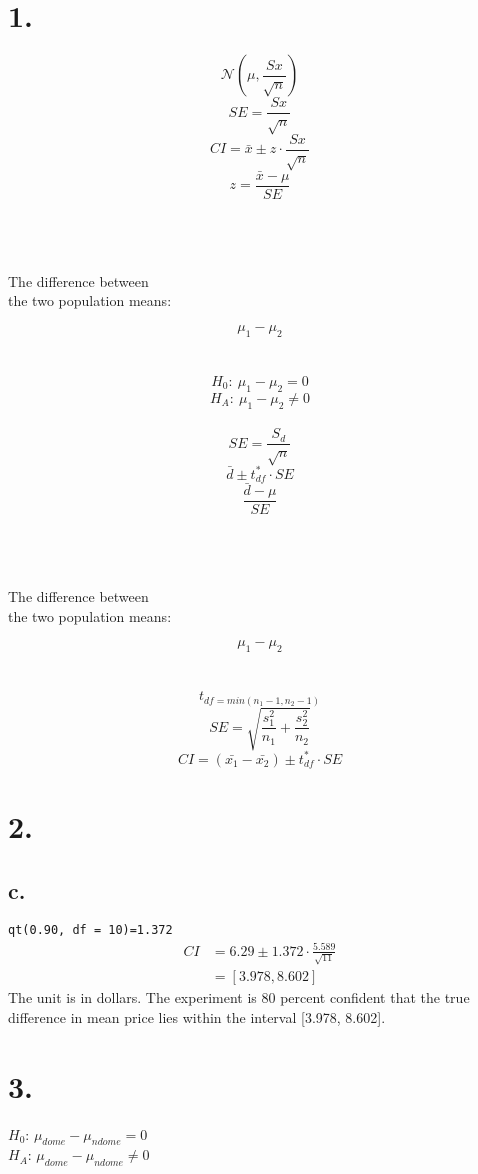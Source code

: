 \documentclass{article}
\begin{document}
\section*{1.}
$$\mathcal{N}(\mu, \frac{Sx}{\sqrt{n}})$$
$$SE = \frac{Sx}{\sqrt{n}}$$
$$CI = \bar{x} \pm z \cdot \frac{Sx}{\sqrt{n}}$$
$$z=\frac{\bar{x} - \mu}{SE}$$\\\\\\

\begin{center}
The difference between \\
the two population means:
\end{center}
$$\mu_1 - \mu_2$$\\\\

$$H_0:\ \mu_1 - \mu_2 = 0$$
$$H_A:\ \mu_1 - \mu_2 \neq 0$$\\

$$SE = \frac{S_d}{\sqrt{n}}$$
$$\bar{d} \pm t_{df}^* \cdot SE$$
$$\frac{\bar{d} - \mu}{SE}$$\\\\\\

\begin{center}
The difference between \\
the two population means:
\end{center}
$$\mu_1 - \mu_2$$\\\\
$$t_{df=min(n_1 -1, n_2 -1)}$$
$$SE = \sqrt{\frac{s_1^2}{n_1}+\frac{s_2^2}{n_2}}$$
$$CI = (\bar{x_1} - \bar{x_2}) \pm t_{df}^* \cdot SE$$

\section*{2.}
\subsection*{c.}
\texttt{qt(0.90, df = 10)=1.372}\\
\begin{align*}
CI &= 6.29 \pm 1.372 \cdot \frac{5.589}{\sqrt{11}}\\
&= [3.978, 8.602]
\end{align*}
The unit is in dollars. The experiment is 80 percent confident that the true 
difference in mean price lies within the interval [3.978, 8.602].

\section*{3.}
$H_0$: $\mu_{dome} - \mu_{ndome} = 0$\\
$H_A$: $\mu_{dome} - \mu_{ndome} \neq 0$
\end{document}

